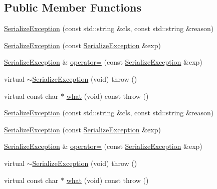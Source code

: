\subsection*{Public Member Functions}
\begin{DoxyCompactItemize}
\item 
\mbox{\hyperlink{classFILEDB_1_1SerializeException_aab805dbcb5d495f039ec743780e5e1a2}{Serialize\+Exception}} (const std\+::string \&cls, const std\+::string \&reason)
\item 
\mbox{\hyperlink{classFILEDB_1_1SerializeException_a4583fae246a4b2d2f468c3a4ec0ecb08}{Serialize\+Exception}} (const \mbox{\hyperlink{classFILEDB_1_1SerializeException}{Serialize\+Exception}} \&exp)
\item 
\mbox{\hyperlink{classFILEDB_1_1SerializeException}{Serialize\+Exception}} \& \mbox{\hyperlink{classFILEDB_1_1SerializeException_a0333bfcab2cc76905ff3507f84148051}{operator=}} (const \mbox{\hyperlink{classFILEDB_1_1SerializeException}{Serialize\+Exception}} \&exp)
\item 
virtual \mbox{\hyperlink{classFILEDB_1_1SerializeException_abd759712a4380483f2ff4f69e1159889}{$\sim$\+Serialize\+Exception}} (void)  throw ()
\item 
virtual const char $\ast$ \mbox{\hyperlink{classFILEDB_1_1SerializeException_a71ecca567a36c3b247d936b5e98e4707}{what}} (void) const  throw ()
\item 
\mbox{\hyperlink{classFILEDB_1_1SerializeException_aab805dbcb5d495f039ec743780e5e1a2}{Serialize\+Exception}} (const std\+::string \&cls, const std\+::string \&reason)
\item 
\mbox{\hyperlink{classFILEDB_1_1SerializeException_a4583fae246a4b2d2f468c3a4ec0ecb08}{Serialize\+Exception}} (const \mbox{\hyperlink{classFILEDB_1_1SerializeException}{Serialize\+Exception}} \&exp)
\item 
\mbox{\hyperlink{classFILEDB_1_1SerializeException}{Serialize\+Exception}} \& \mbox{\hyperlink{classFILEDB_1_1SerializeException_a6ec9d7b0679c5752e900d30b92015302}{operator=}} (const \mbox{\hyperlink{classFILEDB_1_1SerializeException}{Serialize\+Exception}} \&exp)
\item 
virtual \mbox{\hyperlink{classFILEDB_1_1SerializeException_ace236a2abdc486c44c695fbdc209923a}{$\sim$\+Serialize\+Exception}} (void)  throw ()
\item 
virtual const char $\ast$ \mbox{\hyperlink{classFILEDB_1_1SerializeException_a1c143c27480a4c2d85f20a19b3061add}{what}} (void) const  throw ()
\end{DoxyCompactItemize}
